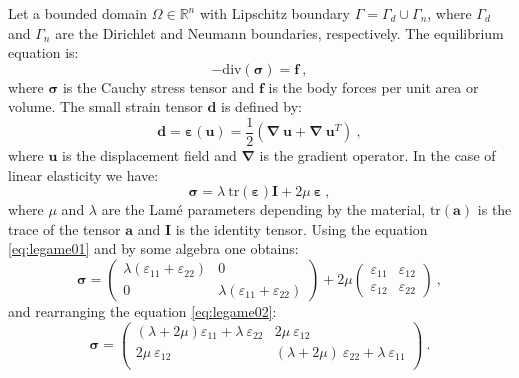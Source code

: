 \documentclass[preprint,12pt,authoryear]{elsarticle}
\begin{document}
Let a bounded domain $\Omega \in \mathbb{R}^{n}$ with Lipschitz boundary $\Gamma= \Gamma_{d}\cup \Gamma_{n}$, where $\Gamma_{d}$ and $\Gamma_{n}$ are the Dirichlet and Neumann boundaries, respectively.   
The equilibrium equation is:
\begin{equation} \label{eq:equilibrio01}
- \mbox{div}(\bm{\sigma}) = \bm{f}\:,
\end{equation}
where $\bm{\sigma}$ is the Cauchy stress tensor and $\bm{f}$ is the body forces per unit area or volume. 
The small strain tensor $\bm{d}$ is defined by:
\begin{equation}\label{eq:congruenza01}
\bm{d} = \bm{\varepsilon}(\bm{u}) = 
\frac{1}{2}(\bm{\nabla} \: \bm{u} + \bm{\nabla} \: \bm{u}^{T}) \:,
\end{equation}
where $\bm{u}$ is the displacement field and $\bm{\nabla}$ is the gradient operator. 
In the case of linear elasticity we have:
\begin{equation} \label{eq:legame01}
\bm{\sigma} = \lambda \: \mbox{tr}(\bm{\varepsilon}) \bm{I} 
+ 2\mu \: \bm{\varepsilon}\:,
\end{equation}
where $\mu$ and $\lambda$ are the Lamé parameters depending by the material, $\mbox{tr}(\bm{a})$ is the trace of the tensor $\bm{a}$ and $\bm{I}$ is the identity tensor. 
Using  the equation \eqref{eq:legame01} and by some algebra one obtains:
\begin{equation} \label{eq:legame02}
\bm{\sigma} =
\left(
\begin{array}{cc}
\lambda (\varepsilon_{11} + \varepsilon_{22}) & 0 \\
0 & \lambda (\varepsilon_{11} + \varepsilon_{22}) 
\end{array}
\right) +2\mu
\left(
\begin{array}{cc}
\varepsilon_{11} & \varepsilon_{12} \\
\varepsilon_{12} & \varepsilon_{22}
\end{array}
\right)\:,
\end{equation}
and rearranging the equation \eqref{eq:legame02}:
\begin{equation} \label{eq:legame03}
\bm{\sigma} =
\left(
\begin{array}{ll}
(\lambda+2\mu) \varepsilon_{11} + \lambda \: \varepsilon_{22} & 2\mu \: \varepsilon_{12} \\
2\mu \: \varepsilon_{12} & (\lambda+2\mu) \: \varepsilon_{22} + \lambda \: \varepsilon_{11}  \\
\end{array}
\right)\:.
\end{equation}
\end{document}
